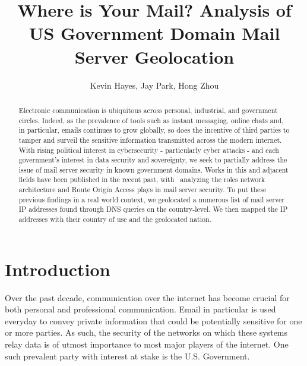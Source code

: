 \documentclass{hotnets21}
\begin{document}


\title{Where is Your Mail? Analysis of US Government Domain Mail Server Geolocation}

\author{Kevin Hayes, Jay Park, Hong Zhou}

\maketitle

\begin{abstract}

Electronic communication is ubiquitous across personal, industrial, and government circles.
Indeed, as the prevalence of tools such as instant messaging, online chats and, in particular, emails continues to grow globally, so does the incentive of third parties to tamper and surveil the sensitive information transmitted across the modern internet.
With rising political interest in cybersecurity - particularly cyber attacks - and each government’s interest in data security and sovereignty, we seek to partially address the issue of mail server security in known government domains.
Works in this and adjacent fields have been published in the recent past, with~\cite{bartoli} analyzing the roles network architecture and Route Origin Access plays in mail server security.
To put these previous findings in a real world context, we geolocated a numerous list of mail server IP addresses found through DNS queries on the country-level.
We then mapped the IP addresses with their country of use and the geolocated nation.

\end{abstract}

\section{Introduction}

Over the past decade, communication over the internet has become crucial for both personal and professional communication.
Email in particular is used everyday to convey private information that could be potentially sensitive for one or more parties.
As such, the security of the networks on which these systems relay data is of utmost importance to most major players of the internet.
One such prevalent party with interest at stake is the U.S. Government.
\end{document}
